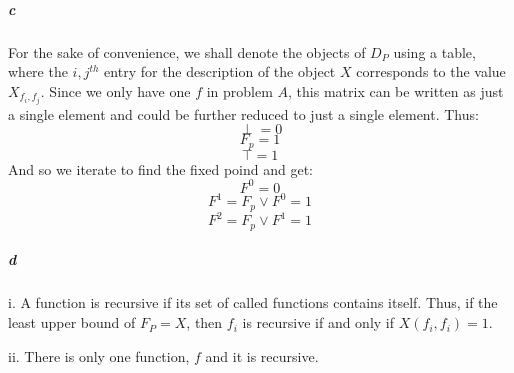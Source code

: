 \documentclass{article}
\begin{document}
\subparagraph{c}
For the sake of convenience, we shall denote the objects of $D_P$ using a table, where the $i,j^{th}$ entry for the description of the object $X$ corresponds to the value $X_{f_i,f_j}$.  Since we only have one $f$ in problem $A$, this matrix can be written as just a single element and could be further reduced to just a single element.  Thus:
\[ \perp = 0 \]
\[ F_p = 1 \]
\[ \top = 1 \]
And so we iterate to find the fixed poind and get:
\[ F^0 = 0 \]
\[ F^1 = F_p \vee F^0 = 1 \]
\[ F^2 = F_p \vee F^1 = 1 \]

\subparagraph{d}
i.  A function is recursive if its set of called functions contains itself.  Thus, if the least upper bound of $F_P = X$, then $f_i$ is recursive if and only if $X(f_i, f_i) = 1$.

ii. There is only one function, $f$ and it is recursive.
\end{document}
